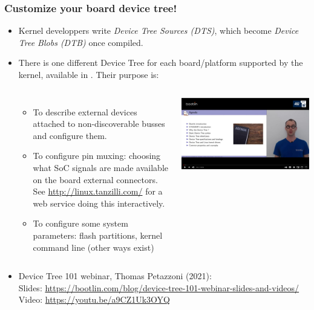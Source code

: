 \begin{frame}
  \frametitle{Customize your board device tree!}
  \small
    \begin{itemize}
    \item Kernel developpers write {\em Device Tree Sources (DTS)},
      which become {\em Device Tree Blobs (DTB)} once compiled.
    \item There is one different Device Tree for each board/platform
      supported by the kernel, available in
      . Their purpose is:
      \begin{columns}
        \begin{itemize}
        \item To describe external devices attached to non-discoverable
          busses and configure them.
        \item To configure pin muxing: choosing what SoC signals are
          made available on the board external connectors.
          See \url{http://linux.tanzilli.com/} for a web service doing this
          interactively.
        \item To configure some system parameters: flash partitions,
          kernel command line (other ways exist)
        \end{itemize}
        \includegraphics[width=\textwidth]{common/device-tree-video.jpg}
      \end{columns}
    \item Device Tree 101 webinar, Thomas Petazzoni (2021):\\
      Slides: \url{https://bootlin.com/blog/device-tree-101-webinar-slides-and-videos/}\\
      Video: \url{https://youtu.be/a9CZ1Uk3OYQ}
    \end{itemize}
\end{frame}
